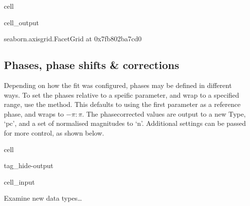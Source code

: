 \documentclass[letterpaper,table,10pt,english]{jupyterBook}
\begin{document}
\begin{sphinxuseclass}{cell}
\begin{sphinxVerbatimOutput}
\begin{sphinxuseclass}{cell_output}
\begin{sphinxVerbatim}[commandchars=\\\{\}]
\PYGZlt{}seaborn.axisgrid.FacetGrid at 0x7fb802ba7cd0\PYGZgt{}
\end{sphinxVerbatim}

\noindent{}

\end{sphinxuseclass}\end{sphinxVerbatimOutput}

\end{sphinxuseclass}

\subsection{Phases, phase shifts \& corrections}
\label{\detokenize{part2/case-study-OCS_290723:phases-phase-shifts-corrections}}
\sphinxAtStartPar
Depending on how the fit was configured, phases may be defined in different ways. To set the phases relative to a speific parameter, and wrap to a specified range, use the  method. This defaults to using the first parameter as a reference phase, and wraps to \(-\pi:\pi\). The phase\sphinxhyphen{}corrected values are output to a new Type, ‘pc’, and a set of normalised magnitudes to ‘n’. Additional settings can be passed for more control, as shown below.

\begin{sphinxuseclass}{cell}
\begin{sphinxuseclass}{tag_hide-output}\begin{sphinxVerbatimInput}

\begin{sphinxuseclass}{cell_input}
\begin{sphinxVerbatim}[commandchars=\\\{\}]
 
\end{sphinxVerbatim}

\end{sphinxuseclass}\end{sphinxVerbatimInput}

\end{sphinxuseclass}
\end{sphinxuseclass}
\sphinxAtStartPar
Examine new data types…
\end{document}
